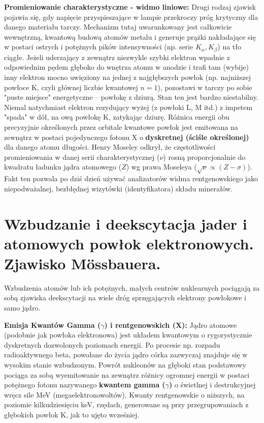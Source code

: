 \documentclass[11pt, a4paper]{article}
\begin{document}
\textbf{Promieniowanie charakterystyczne - widmo liniowe:}
Drugi rodzaj zjawisk pojawia się, gdy napięcie przyspieszające w lampie przekroczy próg krytyczny dla danego materiału tarczy. Mechanizm tutaj uwarunkowany jest całkowicie wewnętrzną, kwantową budową atomów metalu i generuje prążki nakładające się w postaci ostrych i potężnych pików intensywności (np. serie $K_\alpha, K_\beta$) na tło ciągłe.
Jeżeli uderzający z zewnątrz niezwykle szybki elektron wpadnie z odpowiednim pędem głęboko do wnętrza atomu w anodzie i trafi tam (wybije) inny elektron mocno uwięziony na jednej z najgłębszych powłok (np. najniższej powłoce K, czyli głównej liczbie kwantowej $n=1$), pozostawi w tarczy po sobie "puste miejsce" energetyczne – powłokę z dziurą. Stan ten jest bardzo niestabilny. Niemal natychmiast elektron rezydujący wyżej (z powłoki L, M itd.) z impetem "spada" w dół, na ową powłokę K, zatykając dziurę.
Różnica energii obu precyzyjnie określonych przez orbitale kwantowe powłok jest emitowana na zewnątrz w postaci pojedynczego fotonu X o \textbf{dyskretnej (ściśle określonej)} dla danego atomu długości. Henry Moseley odkrył, że częstotliwości promieniowania w danej serii charakterystycznej ($\nu$) rosną proporcjonalnie do kwadratu ładunku jądra atomowego ($Z$) wg prawa Moseleya ($\sqrt{\nu} \propto (Z-\sigma)$). Fakt ten pozwala po dziś dzień używać analizatorów widma rentgenowskiego jako niepodważalnej, bezbłędnej wizytówki (identyfikatora) składu minerałów.

\section{Wzbudzanie i deekscytacja jader i atomowych powłok elektronowych. Zjawisko Mössbauera.}

Wzbudzenia atomów lub ich potężnych, małych centrów nuklearnych pociągają za sobą zjawiska deekscytacji na wiele dróg sprzęgających elektrony powłokowe i samo jądro.

\textbf{Emisja Kwantów Gamma ($\gamma$) i rentgenowskich (X):}
Jądro atomowe (podobnie jak powłoka elektronowa) jest układem kwantowym o rygorystycznie dyskretnych dozwolonych poziomach energii. Po procesie np. rozpadu radioaktywnego beta, powołane do życia jądro córka zazwyczaj znajduje się w wysokim stanie wzbudzonym. Powrót nukleonów na głęboki stan podstawowy pociąga za sobą wyemitowanie na zewnątrz różnicy ogromnej energii w postaci potężnego fotonu nazywanego \textbf{kwantem gamma ($\gamma$)} o świetlnej i destrukcyjnej wręcz sile MeV (megaelektronowoltów). Kwanty rentgenowskie o niższych, na poziomie kilkudziesięciu keV, rzędach, generowane są przy przegrupowaniach z głębokich powłok K, jak to ujęto wcześniej.
\end{document}
